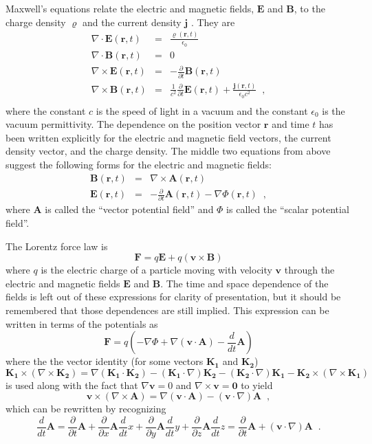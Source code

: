 Maxwell's equations relate the electric and magnetic fields, $\mathbf{E}$ and $\mathbf{B}$, to the charge density $\varrho$ and the current density $\mathbf{j}$ \cite{Cohen1997}.  They are
\begin{eqnarray*}
\nabla\cdot \mathbf{E}(\mathbf{r},t) &=& \frac{\varrho(\mathbf{r},t)}{\epsilon_0}\\
\nabla\cdot \mathbf{B}(\mathbf{r},t) &=& 0\\
\nabla\times \mathbf{E}(\mathbf{r},t) &=& -\frac{\partial}{\partial t}\mathbf{B}(\mathbf{r},t)\\
\nabla\times \mathbf{B}(\mathbf{r},t) &=& \frac{1}{c^2}\frac{\partial}{\partial t}\mathbf{E}(\mathbf{r},t)+\frac{\mathbf{j}(\mathbf{r},t)}{\epsilon_0 c^2}\;\;,\\
\end{eqnarray*}
where the constant $c$ is the speed of light in a vacuum and the constant $\epsilon_0$ is the vacuum permittivity.  The dependence on the position vector $\mathbf{r}$ and time $t$ has been written explicitly for the electric and magnetic field vectors, the current density vector, and the charge density.  The middle two equations from above suggest the following forms for the electric and magnetic fields:
\begin{eqnarray*}
\mathbf{B}(\mathbf{r},t) &=& \nabla\times \mathbf{A}(\mathbf{r},t)\\
\mathbf{E}(\mathbf{r},t) &=& -\frac{\partial}{\partial t}\mathbf{A}(\mathbf{r},t) - \nabla\Phi(\mathbf{r},t)\;\;,
\end{eqnarray*}
where $\mathbf{A}$ is called the ``vector potential field'' and $\Phi$ is called the ``scalar potential field''.  

The Lorentz force law is
$$
\mathbf{F} = q\mathbf{E}+q\left(\mathbf{v}\times\mathbf{B}\right)
$$
where $q$ is the electric charge of a particle moving with velocity $\mathbf{v}$ through the electric and magnetic fields $
\mathbf{E}$ and $\mathbf{B}$.  The time and space dependence of the fields is left out of these expressions for clarity of presentation, but it should be remembered that those dependences are still implied.  This expression can be written in terms of the potentials as
$$
\mathbf{F} = q\left(-\nabla\Phi + \nabla\left(\mathbf{v}\cdot\mathbf{A}\right)-\frac{d}{dt}\mathbf{A}\right)
$$
where the the vector identity (for some vectors $\mathbf{K_1}$ and $\mathbf{K_2}$)
$$
\mathbf{K_1} \times \left(\nabla\times \mathbf{K_2}\right) = \nabla\left(\mathbf{K_1}\cdot\mathbf{K_2}\right)-\left(\mathbf{K_1}\cdot\nabla\right)\mathbf{K_2}-\left(\mathbf{K_2}\cdot\nabla\right)\mathbf{K_1}-\mathbf{K_2}\times\left(\nabla\times\mathbf{K_1}\right)
$$
is used along with the fact that $\nabla\mathbf{v}=0$ and $\nabla\times\mathbf{v}=\mathbf{0}$ to yield
$$
\mathbf{v}\times \left(\nabla\times \mathbf{A}\right) = \nabla\left(\mathbf{v}\cdot\mathbf{A}\right)-\left(\mathbf{v}\cdot\nabla\right)\mathbf{A}\;\;,
$$
which can be rewritten by recognizing
$$
\frac{d}{dt}\mathbf{A} = \frac{\partial}{\partial t}\mathbf{A}+\frac{\partial}{\partial x}\mathbf{A}\frac{d}{dt}x+\frac{\partial}{\partial y}\mathbf{A}\frac{d}{dt}y+\frac{\partial}{\partial z}\mathbf{A}\frac{d}{dt}z=\frac{\partial}{\partial t}\mathbf{A}+\left(\mathbf{v}\cdot\nabla\right)\mathbf{A}\;\;.
$$


